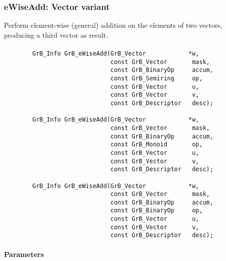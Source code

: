 
\subsubsection{{\sf eWiseAdd}: Vector variant}

Perform element-wise (general) addition on the elements of two vectors,
producing a third vector as result.

\paragraph{\syntax}

\begin{verbatim}
        GrB_Info GrB_eWiseAdd(GrB_Vector            *w,
                              const GrB_Vector       mask,
                              const GrB_BinaryOp     accum,
                              const GrB_Semiring     op, 
                              const GrB_Vector       u,
                              const GrB_Vector       v,
                              const GrB_Descriptor   desc);
                            
        GrB_Info GrB_eWiseAdd(GrB_Vector            *w,
                              const GrB_Vector       mask,
                              const GrB_BinaryOp     accum,
                              const GrB_Monoid       op, 
                              const GrB_Vector       u,
                              const GrB_Vector       v,
                              const GrB_Descriptor   desc);

        GrB_Info GrB_eWiseAdd(GrB_Vector            *w,
                              const GrB_Vector       mask,
                              const GrB_BinaryOp     accum,
                              const GrB_BinaryOp     op, 
                              const GrB_Vector       u,
                              const GrB_Vector       v,
                              const GrB_Descriptor   desc);
\end{verbatim}

\paragraph{Parameters}

